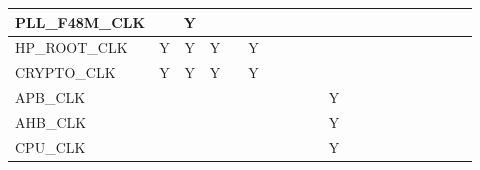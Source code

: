\documentclass[main\_\_CN.tex]{subfiles}
\begin{document}
\begin{landscape}
\begin{tiny}
\begin{longtable}[c]{|m{1.7cm}|c|c|c|c|c|c|c|c|c|C{1.5cm}|c|c|c|c|c|c|c|c|c| }
    PLL\_F48M\_CLK &   & Y &   &  &   &   &   &   &  &   &   &   &   &   &   &   &   &  &  \\ \hline
    HP\_ROOT\_CLK & Y & Y & Y &  & Y &   &   &   &  &   &   &   &   &   &   &   &   &  &  \\ \hline
    CRYPTO\_CLK & Y & Y & Y &  & Y &   &   &   &  &   &   &   &   &   &   &   &   &  &  \\ \hline
    APB\_CLK &   &   &   &  &   &   &   &   &  & Y &   &   &   &   &   &   &   &  &  \\ \hline
    AHB\_CLK &   &   &   &  &   &   &   &   &  & Y &   &   &   &   &   &   &   &  &  \\ \hline
    CPU\_CLK &   &   &   &  &   &   &   &   &  & Y &   &   &   &   &   &   &   &  &  \\ \hline


\end{longtable}

\begin{longtable}[c]{|m{2.5cm}|c|c|c|c|c|c|c|c|c|C{1.4cm}|c|c|c|c|c|c|c|c|c| }


\end{longtable}
\end{tiny}
\end{landscape}
\end{document}
